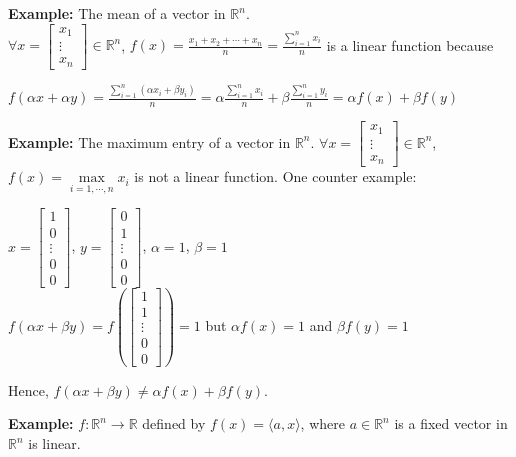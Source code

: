 \documentclass{article}
\begin{document}
\textbf{Example:} The mean of a vector in $\mathbb{R}^{n}$. \\
\bigbreak 
$\forall x = \begin{bmatrix} x_1 \\ \vdots \\ x_n \end{bmatrix} \in \mathbb{R}^{n}$, $f(x) = \frac{x_1 + x_2 + \cdots + x_n}{n} = \frac{\sum_{i=1}^{n} x_i}{n}$ is a linear function because 
\begin{center}
    $f(\alpha x + \alpha y) = \frac{\sum_{i=1}^{n} (\alpha x_i + \beta y_i)}{n} = \alpha \frac{\sum_{i=1}^{n} x_i}{n} + \beta \frac{\sum_{i=1}^{n} y_i}{n} = \alpha f(x) + \beta f(y)$
\end{center}

\bigbreak

\textbf{Example:} The maximum entry of a vector in $\mathbb{R}^{n}$.
\bigbreak
$\forall x = \begin{bmatrix} x_1 \\ \vdots \\ x_n \end{bmatrix} \in \mathbb{R}^{n}$, $f(x) = \underset{i=1,\cdots,n}{\max} x_i$ is not a linear function. 
\bigbreak
One counter example: 
\begin{center}
$x = \begin{bmatrix} 1 \\ 0 \\ \vdots \\ 0 \\ 0 \end{bmatrix}$, $y = \begin{bmatrix} 0 \\ 1 \\ \vdots \\ 0 \\ 0 \end{bmatrix}$, $\alpha = 1$, $\beta = 1$ \\

$f(\alpha x + \beta y) = f(\begin{bmatrix} 1 \\ 1 \\ \vdots \\ 0 \\ 0 \end{bmatrix}) = 1$ but $\alpha f(x) = 1$ and $\beta f(y) = 1 $ 
\end{center} 
Hence, $f(\alpha x + \beta y) \neq \alpha f(x) + \beta f(y)$. 
\bigbreak

\textbf{Example:} $f: \mathbb{R}^{n} \to \mathbb{R}$ defined by $f(x) = \langle a,x\rangle $, where $a \in \mathbb{R}^{n}$ is a fixed vector in $\mathbb{R}^{n}$ is linear.
\end{document}
